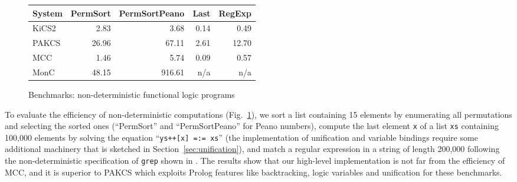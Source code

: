 \documentclass{llncs}
\newcommand{\code}[1]{\mbox{\small\texttt{#1}}}
\newcommand{\ccode}[1]{``\code{#1}''}
\begin{document}
\begin{figure}
\centering
\begin{tabular}{|@{~~}l@{~~}|*{4}{@{~~}r@{~~}|}}
\hline
System  & PermSort & PermSortPeano &  Last & RegExp \\\hline
KiCS2   &    2.83  &        3.68   &  0.14 &   0.49 \\
PAKCS   &   26.96  &       67.11   &  2.61 &  12.70 \\
MCC     &    1.46  &        5.74   &  0.09 &   0.57 \\
MonC    &   48.15  &      916.61   &   n/a &    n/a \\
\hline
\end{tabular}
\caption{Benchmarks: non-deterministic functional logic programs}
 \label{fig:bench-nondet}
\end{figure}
%
To evaluate the efficiency of non-deterministic computations
(Fig.~\ref{fig:bench-nondet}),
we sort a list containing 15 elements by enumerating all permutations
and selecting the sorted ones (``PermSort'' and ``PermSortPeano''
for Peano numbers),
compute the last element \code{x}
of a list \code{xs} containing 100,000 elements
by solving the equation \ccode{ys++[x] =:= xs}
(the implementation of unification and variable bindings
require some additional machinery that is sketched in
Section~\ref{sec:unification}),
and match a regular expression in a string of length 200,000
following the non-deterministic specification of \code{grep} shown
in \cite{AntoyHanus10CACM}.
The results show that our high-level implementation is not far
from the efficiency of MCC,
and it is superior to PAKCS which exploits Prolog features
like backtracking, logic variables and unification for these benchmarks.
\end{document}
